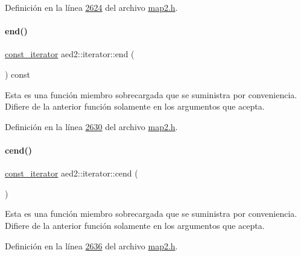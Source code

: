 Definición en la línea \hyperlink{map2_8h_source_l02624}{2624} del archivo \hyperlink{map2_8h_source}{map2.\+h}.

\mbox{\label{classaed2_1_1iterator_a66ee57cfa3bed6ffa74a1c8c23b13767_a66ee57cfa3bed6ffa74a1c8c23b13767}} 
\paragraph{\texorpdfstring{end()}{end()}\hspace{0.1cm}{\footnotesize\ttfamily [2/2]}}
{\footnotesize\ttfamily \hyperlink{classaed2_1_1iterator_1_1const__iterator}{const\+\_\+iterator} aed2\+::iterator\+::end (\begin{DoxyParamCaption}{ }\end{DoxyParamCaption}) const\hspace{0.3cm}{\ttfamily [inline]}}

Esta es una función miembro sobrecargada que se suministra por conveniencia. Difiere de la anterior función solamente en los argumentos que acepta. 

Definición en la línea \hyperlink{map2_8h_source_l02630}{2630} del archivo \hyperlink{map2_8h_source}{map2.\+h}.

\mbox{\label{classaed2_1_1iterator_a2d0d226485d9280d16a739d0b9dae525_a2d0d226485d9280d16a739d0b9dae525}} 
\paragraph{\texorpdfstring{cend()}{cend()}}
{\footnotesize\ttfamily \hyperlink{classaed2_1_1iterator_1_1const__iterator}{const\+\_\+iterator} aed2\+::iterator\+::cend (\begin{DoxyParamCaption}{ }\end{DoxyParamCaption})\hspace{0.3cm}{\ttfamily [inline]}}

Esta es una función miembro sobrecargada que se suministra por conveniencia. Difiere de la anterior función solamente en los argumentos que acepta. 

Definición en la línea \hyperlink{map2_8h_source_l02636}{2636} del archivo \hyperlink{map2_8h_source}{map2.\+h}.

